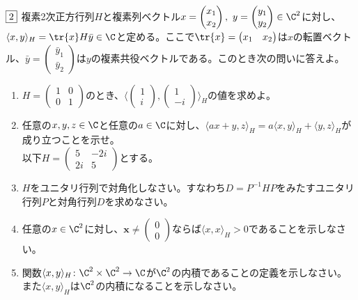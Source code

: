 \begin{tcolorbox} %
    $\fbox{2}$ 複素2次正方行列$H$と複素列ベクトル$x= \begin{pmatrix}x_1\\ x_2\end{pmatrix},\ y= \begin{pmatrix}y_1\\ y_2\end{pmatrix}\in \C^2$に対し、$\langle{x, y}\rangle_H= \tr{x}H\bar{y}\in \C$と定める。ここで$\tr{x}= \begin{pmatrix}x_1& x_2\end{pmatrix}$は$x$の転置ベクトル、$\bar{y}= \begin{pmatrix}\bar{y}_1\\ \bar{y}_2\end{pmatrix}$は$y$の複素共役ベクトルである。このとき次の問いに答えよ。
\begin{enumerate}
    \item $H= \begin{pmatrix}1& 0\\ 0& 1\end{pmatrix}$のとき、$\langle{\begin{pmatrix}1\\ i\end{pmatrix}, \begin{pmatrix}1\\ -i\end{pmatrix}}\rangle_H$の値を求めよ。
    \item 任意の$x, y, z\in \C$と任意の$a\in \C$に対し、$\langle{ax+ y, z}\rangle_H= a\langle{x, y}\rangle_H+ \langle{y, z}\rangle_H$が成り立つことを示せ。\\
    以下$H= \begin{pmatrix}5& -2i\\ 2i& 5\end{pmatrix}$とする。
    \item $H$をユニタリ行列で対角化しなさい。すなわち$D= P^{-1}HP$をみたすユニタリ行列$P$と対角行列$D$を求めなさい。
    \item 任意の$x\in \C^2$に対し、$\bm{x}\ne \begin{pmatrix}0\\ 0\end{pmatrix}$ならば$\langle{x, x}\rangle_H> 0$であることを示しなさい。
    \item 関数$\langle{x, y}\rangle_H\colon \C^2\times \C^2\to \C$が$\C^2$の内積であることの定義を示しなさい。また$\langle{x, y}\rangle_H$は$\C^2$の内積になることを示しなさい。
\end{enumerate}
\end{tcolorbox} 


